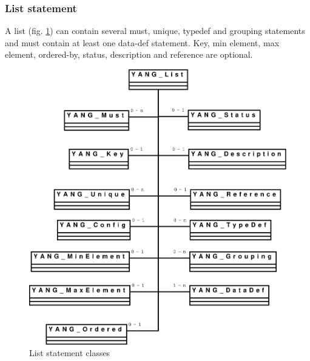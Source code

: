 \documentclass[a4paper]{article}
\begin{document}
\subsubsection{List statement}

A list (fig. \ref{list}) can contain several must, unique, typedef and
grouping statements and must  contain at least one data-def statement.
Key,  min element,  max element,  ordered-by, status,  description and
reference are optional.
\begin{figure}[htbp]
\begin{center}
\includegraphics[scale = .3]{list.eps}
\end{center}
\caption{List statement classes}
\label{list}
\end{figure}
\end{document}

